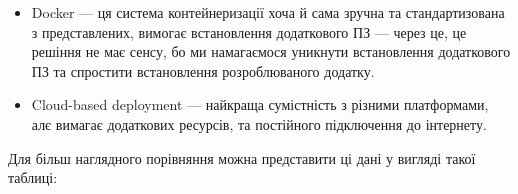 \documentclass[14pt]{extarticle}
\begin{document}
\begin{itemize}[labelindent=\dimexpr{}\relax, leftmargin=*]
    \item Docker \cite{docker} ---
      ця система контейнеризації хоча й сама зручна та стандартизована
      з представлених, вимогає встановлення додаткового ПЗ ---
      через це, це решіння не має сенсу,
      бо ми намагаємося уникнути встановлення додаткового ПЗ
      та спростити встановлення розроблюваного додатку.
    
    \item Cloud-based deployment \cite{wiki_cloud_computing} ---
      найкраща сумістність з різними платформами,
      алє вимагає додаткових ресурсів, та постійного підключення до інтернету.
  \end{itemize}

  Для більш наглядного порівняння можна представити ці дані
  у вигляді такої таблиці:

  \begin{table}
    \centering
  \end{table}
\end{document}
